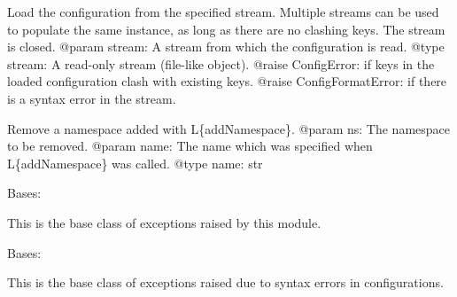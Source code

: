 \documentclass[a4paper,10pt,english]{sphinxmanual}
\begin{document}
\begin{fulllineitems}
\begin{fulllineitems}
\label{commands/apidoc/src:src.pyconf.Config.load}
Load the configuration from the specified stream. Multiple streams can
be used to populate the same instance, as long as there are no
clashing keys. The stream is closed.
@param stream: A stream from which the configuration is read.
@type stream: A read-only stream (file-like object).
@raise ConfigError: if keys in the loaded configuration clash with
existing keys.
@raise ConfigFormatError: if there is a syntax error in the stream.

\end{fulllineitems}


\begin{fulllineitems}
\label{commands/apidoc/src:src.pyconf.Config.removeNamespace}
Remove a namespace added with L\{addNamespace\}.
@param ns: The namespace to be removed.
@param name: The name which was specified when L\{addNamespace\} was
called.
@type name: str

\end{fulllineitems}


\end{fulllineitems}


\begin{fulllineitems}
\label{commands/apidoc/src:src.pyconf.ConfigError}
Bases: 

This is the base class of exceptions raised by this module.

\end{fulllineitems}


\begin{fulllineitems}
\label{commands/apidoc/src:src.pyconf.ConfigFormatError}
Bases: {\hyperref[commands/apidoc/src:src.pyconf.ConfigError]{}}

This is the base class of exceptions raised due to syntax errors in
configurations.

\end{fulllineitems}
\end{document}
